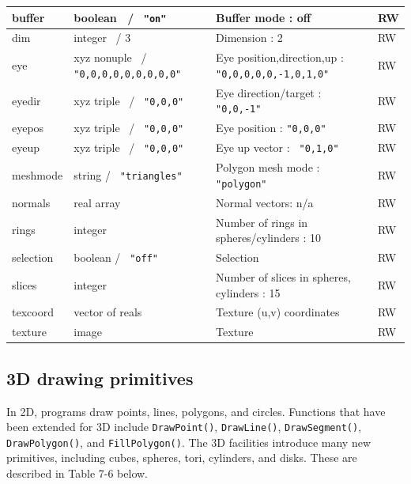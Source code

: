 \begin{center}
\begin{supertabular}{|m{1.076in}|m{1.5in}|m{2.58in}|m{0.448in}|}
buffer &
boolean \ / \texttt{ "on" } &
Buffer mode : off &
RW\\\hline
dim &
integer \ / 3 &
Dimension : 2 &
RW\\\hline
eye &
xyz nonuple \ / \texttt{ "0,0,0,0,0,0,0,0,0"} &
Eye position,direction,up : {\tt "0,0,0,0,0,-1,0,1,0"} &
RW\\\hline
eyedir &
xyz triple \ / \texttt{ "0,0,0"} &
Eye direction/target : \texttt{ "0,0,-1"} &
RW\\\hline
eyepos &
xyz triple \ / \texttt{ "0,0,0" } &
Eye position : {\tt "0,0,0"} &
RW\\\hline
eyeup &
xyz triple \ / \texttt{ "0,0,0" } &
Eye up vector : \texttt{ "0,1,0" } &
RW\\\hline
meshmode &
string / \texttt{ "triangles"} &
Polygon mesh mode : \texttt{ "polygon" } &
RW\\\hline
normals &
real array  &
Normal vectors: n/a &
RW\\\hline
rings &
integer &
Number of rings in spheres/cylinders : 10 &
RW\\\hline
selection &
boolean / \texttt{ "off" } &
Selection &
RW\\\hline
slices &
integer &
Number of slices in spheres, cylinders : 15  &
RW\\\hline
texcoord &
vector of reals &
Texture (u,v) coordinates &
RW\\\hline
texture &
image &
Texture &
RW\\\hline
\end{supertabular}
\end{center}


\subsection*{3D drawing primitives}

In 2D, programs draw points, lines, polygons, and circles. Functions
that have been extended for 3D include \texttt{DrawPoint()},
\texttt{DrawLine()}, \texttt{DrawSegment()}, \texttt{DrawPolygon()},
and \texttt{FillPolygon()}. The 3D facilities introduce many new
primitives, including cubes, spheres, tori, cylinders, and
disks. These are described in Table 7-6 below.

